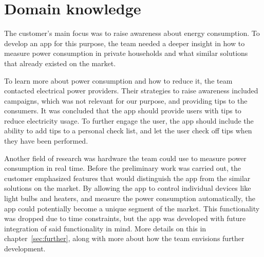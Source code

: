 \section{Domain knowledge}
The customer's main focus was to raise awareness about energy consumption. To develop an app for this purpose, the team needed a deeper insight in how to measure power consumption in private households and what similar solutions that already existed on the market.

To learn more about power consumption and how to reduce it, the team contacted electrical power providers. Their strategies to raise awareness included campaigns, which was not relevant for our purpose, and providing tips to the consumers. It was concluded that the app should provide users with tips to reduce electricity usage. To further engage the user, the app should include the ability to add tips to a personal check list, and let the user check off tips when they have been performed.

Another field of research was hardware the team could use to measure power consumption in real time. Before the preliminary work was carried out, the customer emphasized features that would distinguish the app from the similar solutions on the market. By allowing the app to control individual devices like light bulbs and heaters, and measure the power consumption automatically, the app could potentially become a unique segment of the market. This functionality was dropped due to time constraints, but the app was developed with future integration of said functionality in mind. More details on this in chapter~\ref{sec:further}, along with more about how the team envisions further development.
